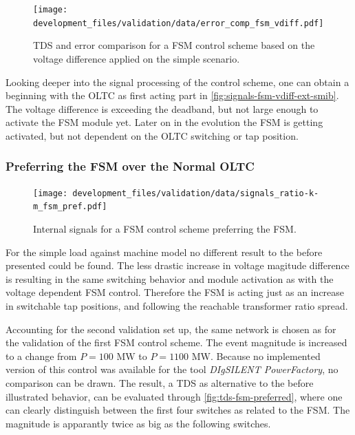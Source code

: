 \begin{figure}[htbp!]
    \centering
    \texttt{[image: development\_files/validation/data/error\_comp\_fsm\_vdiff.pdf]}
    \caption[\acs{TDS} and error comparison for a \acs{FSM} control scheme based on the voltage difference applied on the simple scenario]{\acs{TDS} and error comparison for a \acs{FSM} control scheme based on the voltage difference applied on the simple scenario.}
    \label{fig:error-fsm-vdiff-simple}
\end{figure}

Looking deeper into the signal processing of the control scheme, one can obtain a beginning with the \acs{OLTC} as first acting part in \autoref{fig:signals-fsm-vdiff-ext-smib}.
The voltage difference is exceeding the deadband, but not large enough to activate the \acs{FSM} module yet.
Later on in the evolution the \acs{FSM} is getting activated, but not dependent on the \acs{OLTC} switching or tap position.

\subsubsection{Preferring the FSM over the Normal OLTC}

\begin{figure}[htbp!]
    \centering
    \texttt{[image: development\_files/validation/data/signals\_ratio-k-m\_fsm\_pref.pdf]}
    \caption[Internal signals for a \acs{FSM} control scheme preferring the \acs{FSM}]{Internal signals  for a \acs{FSM} control scheme preferring the \acs{FSM}.}
    \label{fig:signals-fsm-preferred}
\end{figure}

For the simple load against machine model no different result to the before presented could be found.
The less drastic increase in voltage magitude difference is resulting in the same switching behavior and module activation as with the voltage dependent \acs{FSM} control.
Therefore the \acs{FSM} is acting just as an increase in switchable tap positions, and following the reachable transformer ratio spread.

Accounting for the second validation set up, the same network is chosen as for the validation of the first \acs{FSM} control scheme.
The event magnitude is increased to a change from $P=100\text{ MW}$ to $P=1100\text{ MW}$.
Because no implemented version of this control was available for the tool \textit{DIgSILENT PowerFactory}, no comparison can be drawn.
The result, a \acs{TDS} as alternative to the before illustrated behavior, can be evaluated through \autoref{fig:tds-fsm-preferred}, where one can clearly distinguish between the first four switches as related to the \acs{FSM}.
The magnitude is apparantly twice as big as the following switches.

